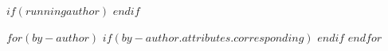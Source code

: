 \usepackage{url,hyperref,lineno,microtype,subcaption}
\usepackage[onehalfspacing]{setspace}

\linenumbers

\def\keyFont{\fontsize{8}{11}\helveticabold }
$if(runningauthor)$
\def\firstAuthorLast{$runningauthor$ {et~al.}}
$endif$
\def\Authors{$for(by-author)$$by-author.name.literal$\textsuperscript{$if(by-author.affiliations)$$for(by-author.affiliations)$$it.id$$sep$,$endfor$$endif$$if(by-author.attributes.corresponding)$,*$endif$}$sep$, $endfor$}
\def\Address{$for(by-affiliation)$ \textsuperscript{$it.id$}$_affiliation.tex()$$sep$\\ $endfor$}

$for(by-author)$
$if(by-author.attributes.corresponding)$
\def\corrAuthor{$by-author.name.literal$}
\def\corrEmail{$by-author.email$}
$endif$
$endfor$
